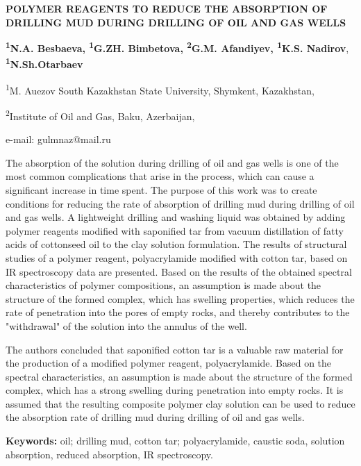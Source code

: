 \begin{center}
{\large\bfseries POLYMER REAGENTS TO REDUCE THE ABSORPTION OF DRILLING MUD DURING
DRILLING OF OIL AND GAS WELLS}

{\bfseries \textsuperscript{1}N.A. Besbaeva, \textsuperscript{1}G.ZH. Bimbetova\envelope, \textsuperscript{2}G.M. Afandiyev, \textsuperscript{1}K.S. Nadirov}, {\bfseries \textsuperscript{1}N.Sh.Otarbaev}

\textsuperscript{1}M. Auezov South Kazakhstan State University,
Shymkent, Kazakhstan,

\textsuperscript{2}Institute of Oil and Gas, Baku, Azerbaijan,

e-mail: gulmnaz@mail.ru
\end{center}

The absorption of the solution during drilling of oil and gas wells is
one of the most common complications that arise in the process, which
can cause a significant increase in time spent. The purpose of this work
was to create conditions for reducing the rate of absorption of drilling
mud during drilling of oil and gas wells. A lightweight drilling and
washing liquid was obtained by adding polymer reagents modified with
saponified tar from vacuum distillation of fatty acids of cottonseed oil
to the clay solution formulation. The results of structural studies of a
polymer reagent, polyacrylamide modified with cotton tar, based on IR
spectroscopy data are presented. Based on the results of the obtained
spectral characteristics of polymer compositions, an assumption is made
about the structure of the formed complex, which has swelling
properties, which reduces the rate of penetration into the pores of
empty rocks, and thereby contributes to the "withdrawal" of the solution
into the annulus of the well.

The authors concluded that saponified cotton tar is a valuable raw
material for the production of a modified polymer reagent,
polyacrylamide. Based on the spectral characteristics, an assumption is
made about the structure of the formed complex, which has a strong
swelling during penetration into empty rocks. It is assumed that the
resulting composite polymer clay solution can be used to reduce the
absorption rate of drilling mud during drilling of oil and gas wells.

{\bfseries Keywords:} oil; drilling mud, cotton tar; polyacrylamide,
caustic soda, solution absorption, reduced absorption, IR spectroscopy.

